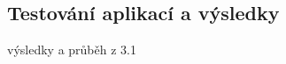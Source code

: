 




\subsection{Testování aplikací a výsledky}

\begin{citemize}
	\item výsledky a průběh z 3.1
\end{citemize}

